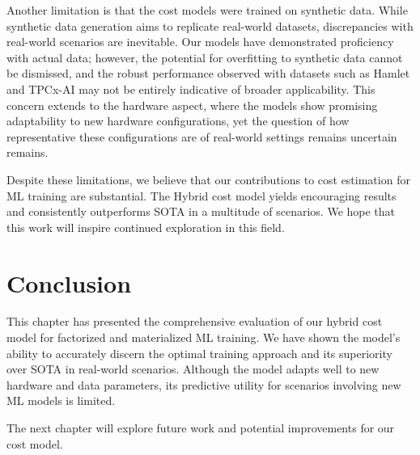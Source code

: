 Another limitation is that the cost models were trained on synthetic data. While synthetic data generation aims to replicate real-world datasets, discrepancies with real-world scenarios are inevitable.  Our models have demonstrated proficiency with actual data; however, the potential for overfitting to synthetic data cannot be dismissed, and the robust performance observed with datasets such as Hamlet and TPCx-AI may not be entirely indicative of broader applicability. This concern extends to the hardware aspect, where the models show promising adaptability to new hardware configurations, yet the question of how representative these configurations are of real-world settings remains uncertain remains.

Despite these limitations, we believe that our contributions to cost estimation for ML training are substantial. The Hybrid cost model yields encouraging results and consistently outperforms SOTA in a multitude of scenarios. We hope that this work will inspire continued exploration in this field.

\section{Conclusion}
\label{sec:eval-conclusion}
This chapter has presented the comprehensive evaluation of our hybrid cost model for factorized and materialized ML training. We have shown the model's ability to accurately discern the optimal training approach and its superiority over SOTA in real-world scenarios. Although the model adapts well to new hardware and data parameters, its predictive utility for scenarios involving new ML models is limited.

The next chapter will explore future work and potential improvements for our cost model.

